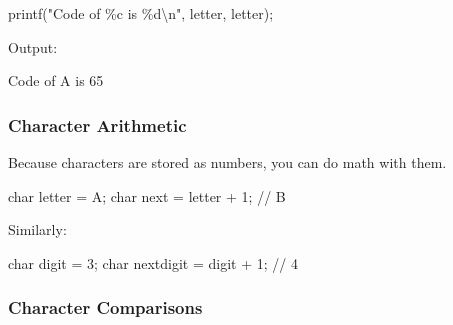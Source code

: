 \documentclass[
  letterpaper,
  DIV=11,
  numbers=noendperiod]{scrreprt}
\newenvironment{Shaded}{\begin{snugshade}}{\end{snugshade}}
\newcommand{\CharTok}[1]{\textcolor[rgb]{0.13,0.47,0.30}{#1}}
\newcommand{\CommentTok}[1]{\textcolor[rgb]{0.37,0.37,0.37}{#1}}
\newcommand{\DataTypeTok}[1]{\textcolor[rgb]{0.68,0.00,0.00}{#1}}
\newcommand{\DecValTok}[1]{\textcolor[rgb]{0.68,0.00,0.00}{#1}}
\newcommand{\ExtensionTok}[1]{\textcolor[rgb]{0.00,0.23,0.31}{#1}}
\newcommand{\NormalTok}[1]{\textcolor[rgb]{0.00,0.23,0.31}{#1}}
\newcommand{\OperatorTok}[1]{\textcolor[rgb]{0.37,0.37,0.37}{#1}}
\newcommand{\SpecialCharTok}[1]{\textcolor[rgb]{0.37,0.37,0.37}{#1}}
\newcommand{\StringTok}[1]{\textcolor[rgb]{0.13,0.47,0.30}{#1}}
\begin{document}
\begin{Shaded}
\begin{Highlighting}[]
\NormalTok{printf}\OperatorTok{(}\StringTok{"Code of }\SpecialCharTok{\%c}\StringTok{ is }\SpecialCharTok{\%d\textbackslash{}n}\StringTok{"}\OperatorTok{,}\NormalTok{ letter}\OperatorTok{,}\NormalTok{ letter}\OperatorTok{);}
\end{Highlighting}
\end{Shaded}

Output:

\begin{Shaded}
\begin{Highlighting}[]
\ExtensionTok{Code}\NormalTok{ of A is 65}
\end{Highlighting}
\end{Shaded}

\subsubsection{Character Arithmetic}\label{character-arithmetic}

Because characters are stored as numbers, you can do math with them.

\begin{Shaded}
\begin{Highlighting}[]
\DataTypeTok{char}\NormalTok{ letter }\OperatorTok{=} \CharTok{\textquotesingle{}A\textquotesingle{}}\OperatorTok{;}
\DataTypeTok{char}\NormalTok{ next }\OperatorTok{=}\NormalTok{ letter }\OperatorTok{+} \DecValTok{1}\OperatorTok{;}   \CommentTok{// \textquotesingle{}B\textquotesingle{}}
\end{Highlighting}
\end{Shaded}

Similarly:

\begin{Shaded}
\begin{Highlighting}[]
\DataTypeTok{char}\NormalTok{ digit }\OperatorTok{=} \CharTok{\textquotesingle{}3\textquotesingle{}}\OperatorTok{;}
\DataTypeTok{char}\NormalTok{ nextdigit }\OperatorTok{=}\NormalTok{ digit }\OperatorTok{+} \DecValTok{1}\OperatorTok{;}  \CommentTok{// \textquotesingle{}4\textquotesingle{}}
\end{Highlighting}
\end{Shaded}

\subsubsection{Character Comparisons}\label{character-comparisons}
\end{document}
